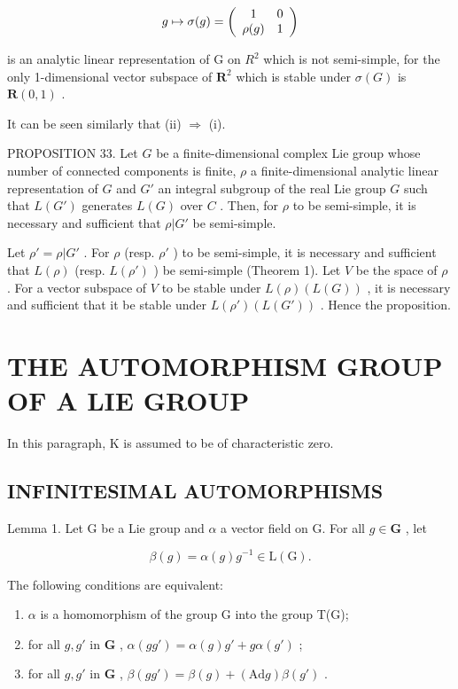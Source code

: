 \[
g \mapsto \sigma (g) = \left( \begin{array}{c c} 1 & 0 \\ \rho (g) & 1 \end{array} \right)
\]

is an analytic linear representation of G on \(R^{2}\) which is not semi-simple, for the only 1-dimensional vector subspace of \(\mathbf{R}^2\) which is stable under \(\sigma(G)\) is \(\mathbf{R}(0,1)\) .

It can be seen similarly that (ii) \(\Rightarrow\) (i).

PROPOSITION 33. Let \(G\) be a finite-dimensional complex Lie group whose number of connected components is finite, \(\rho\) a finite-dimensional analytic linear representation of \(G\) and \(G'\) an integral subgroup of the real Lie group \(G\) such that \(L(G')\) generates \(L(G)\) over \(C\) . Then, for \(\rho\) to be semi-simple, it is necessary and sufficient that \(\rho |G'\) be semi-simple.

Let \(\rho' = \rho|G'\) . For \(\rho\) (resp. \(\rho'\) ) to be semi-simple, it is necessary and sufficient that \(L(\rho)\) (resp. \(L(\rho')\) ) be semi-simple (Theorem 1). Let \(V\) be the space of \(\rho\) . For a vector subspace of \(V\) to be stable under \(L(\rho)(L(G))\) , it is necessary and sufficient that it be stable under \(L(\rho')(L(G'))\) . Hence the proposition.

\section{THE AUTOMORPHISM GROUP OF A LIE GROUP}

In this paragraph, K is assumed to be of characteristic zero.

\subsection{INFINITESIMAL AUTOMORPHISMS}

Lemma 1. Let G be a Lie group and \(\alpha\) a vector field on G. For all \(g \in \mathbf{G}\) , let

\[
\beta (g) = \alpha (g) g ^ {- 1} \in \mathrm{L} (\mathrm{G}).
\]

The following conditions are equivalent:

\begin{enumerate}
\def\labelenumi{(\roman{enumi})}
\item
  \(\alpha\) is a homomorphism of the group G into the group T(G);
\item
  for all \(g, g'\) in \(\mathbf{G}\) , \(\alpha(gg') = \alpha(g)g' + g\alpha(g')\) ;
\item
  for all \(g, g'\) in \(\mathbf{G}\) , \(\beta(gg') = \beta(g) + (\mathrm{Ad}g)\beta(g')\) .
\end{enumerate}

